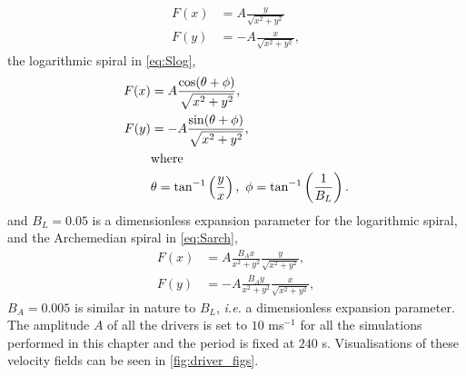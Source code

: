 \begin{subequations}
	\begin{align}
		F(x) &= A \frac{y}{\sqrt{x^2 + y^2}}\\
		F(y) &= - A \frac{x}{\sqrt{x^2 + y^2}},
	\end{align}
	\label{eq:Suni}
\end{subequations}
the logarithmic spiral in \cref{eq:Slog},
\begin{subequations}
	\begin{align}
		F(x) &= A \frac{\cos(\theta + \phi)}{\sqrt{x^2 + y^2}},\\
		F(y) &= - A \frac{\sin(\theta + \phi)}{\sqrt{x^2 + y^2}},\\
			&\text{where}\notag\\
			&\theta = \tan^{-1}\left(\frac{y}{x}\right),\ \phi = \tan^{-1}\left(\frac{1}{B_L}\right).\notag	
	\end{align}
	\label{eq:Slog}
\end{subequations}
and $B_L = 0.05$ is a dimensionless expansion parameter for the logarithmic spiral, and the Archemedian spiral in \cref{eq:Sarch},
\begin{subequations}
	\begin{align}
		F(x) &= A \frac{B_Ax}{x^2 + y^2} \frac{y}{\sqrt{x^2 + y^2}},\\
		F(y) &= - A \frac{B_Ay}{x^2 + y^2} \frac{x}{\sqrt{x^2 + y^2}},
	\end{align}
	\label{eq:Sarch}
\end{subequations}
$B_A = 0.005$ is similar in nature to $B_L$, \textit{i.e.} a dimensionless expansion parameter.
The amplitude $A$ of all the drivers is set to $10$ ms$^{-1}$ for all the simulations performed in this chapter and the period is fixed at $240$ s.
Visualisations of these velocity fields can be seen in \cref{fig:driver_figs}.


